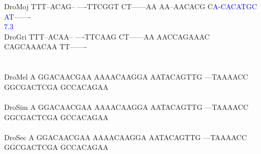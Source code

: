 \documentclass[11pt,twoside,reqno,a4paper]{article}
\begin{document}
{DroMoj	TTT--ACAG--	----TTCGGT	CT------AA	AA--AACACG	C\textcolor{Blue}{A}\textcolor{Blue}{-}\textcolor{Blue}{C}\textcolor{Blue}{A}\textcolor{Blue}{C}\textcolor{Blue}{A}\textcolor{Blue}{T}\textcolor{Blue}{G}\textcolor{Blue}{C}	\textcolor{Blue}{A}\textcolor{Blue}{T}-------\\
\hspace*{7\charwidth}\hspace*{1\charwidth}\hspace*{1\charwidth}\hspace*{1\charwidth}\hspace*{1\charwidth}\hspace*{42\charwidth}\textcolor{Blue}{7.3}\hspace*{1\charwidth}\\
DroGri	TTT--ACAA--	----TTCAAG	CT------AA	AACCAGAAAC	CAGCAAACAA	TT-------\\
\hspace*{7\charwidth}\hspace*{1\charwidth}\hspace*{1\charwidth}\hspace*{1\charwidth}\hspace*{1\charwidth}\hspace*{1\charwidth}\\
\\
DroMel	A	GGACAACGAA	AAAACAAGGA	AATACAGTTG	---TAAAACC	GGCGACTCGA	GCCACAGAA\\
\hspace*{7\charwidth}\hspace*{1\charwidth}\hspace*{1\charwidth}\hspace*{1\charwidth}\hspace*{1\charwidth}\hspace*{1\charwidth}\hspace*{1\charwidth}\\
DroSim	A	GGACAACGAA	AAAACAAGGA	AATACAGTTG	---TAAAACC	GGCGACTCGA	GCCACAGAA\\
\hspace*{7\charwidth}\hspace*{1\charwidth}\hspace*{1\charwidth}\hspace*{1\charwidth}\hspace*{1\charwidth}\hspace*{1\charwidth}\hspace*{1\charwidth}\\
DroSec	A	GGACAACGAA	AAAACAAGGA	AATACAGTTG	---TAAAACC	GGCGACTCGA	GCCACAGAA\\
}
\end{document}
